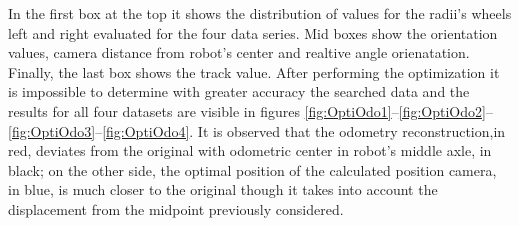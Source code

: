 In the first box at the top it shows the distribution of values for the radii's wheels left and right evaluated for the four data series.
Mid boxes show the orientation values, camera distance from robot's center and realtive angle orienatation.
Finally, the last box shows the track value.
After performing the optimization it is impossible to determine with greater accuracy the searched data and the results for all four datasets are visible in figures \ref{fig:OptiOdo1}--\ref{fig:OptiOdo2}--\ref{fig:OptiOdo3}--\ref{fig:OptiOdo4}.
It is observed that the odometry reconstruction,in red, deviates from the original with odometric center in robot's middle axle, in black; on the other side, the optimal position of the calculated position camera, in blue, is much closer to the original though it takes into account the displacement from the midpoint previously considered.